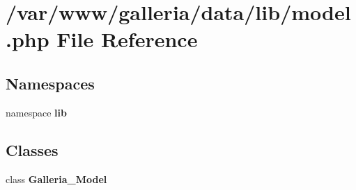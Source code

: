 \section{/var/www/galleria/data/lib/model.php File Reference}
\label{model_8php}
\subsection*{Namespaces}
\begin{CompactItemize}
\item 
namespace {\bf lib}
\end{CompactItemize}
\subsection*{Classes}
\begin{CompactItemize}
\item 
class {\bf Galleria\_\-Model}
\end{CompactItemize}
